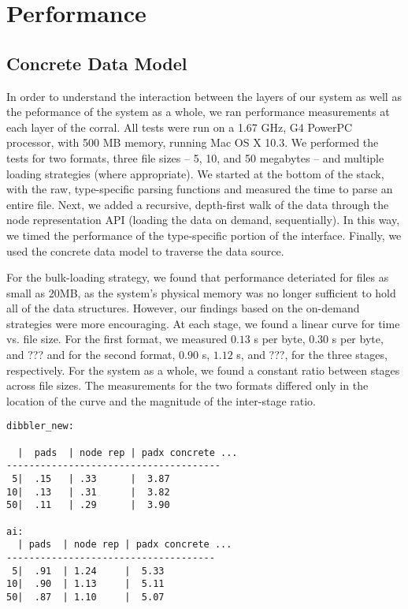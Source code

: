 \section{Performance}
\label{section:performance}

\subsection{Concrete Data Model} 
In order to understand the interaction between the layers of our
system as well as the peformance of the system as a whole, we ran
performance measurements at each layer of the corral. All tests were
run on a 1.67 GHz, G4 PowerPC processor, with 500 MB memory, running
Mac OS X 10.3. We performed the tests for two formats, three file
sizes -- 5, 10, and 50 megabytes -- and multiple loading strategies
(where appropriate). We started at the bottom of the stack, with the
raw, type-specific parsing functions and measured the time to parse an
entire file. Next, we added a recursive, depth-first walk of the data
through the \padx node representation API (loading the data on demand,
sequentially). In this way, we timed the performance of the
type-specific portion of the \xml interface.  Finally, we used the
\padx concrete data model to traverse the data source.

For the bulk-loading strategy, we found that performance deteriated
for files as small as 20MB, as the system's physical memory was no
longer sufficient to hold all of the data structures. However, our
findings based on the on-demand strategies were more encouraging. At
each stage, we found a linear curve for time vs. file size. For the
first format, we measured $0.13$ {\mu}s per byte, $0.30$ {\mu}s per
byte, and ??? and for the second format, $0.90$ {\mu}s, $1.12$ {\mu}s,
and ???, for the three stages, respectively. For the system as a
whole, we found a constant ratio between stages across file sizes. The
measurements for the two formats differed only in the location of the
curve and the magnitude of the inter-stage ratio.

\begin{verbatim}
dibbler_new:

  |  pads  | node rep | padx concrete ...
--------------------------------------
 5|  .15   | .33      |  3.87
10|  .13   | .31      |  3.82
50|  .11   | .29      |  3.90

ai:
  | pads  | node rep | padx concrete ...
-------------------------------------
 5|  .91  | 1.24     |  5.33
10|  .90  | 1.13     |  5.11
50|  .87  | 1.10     |  5.07
\end{verbatim}

